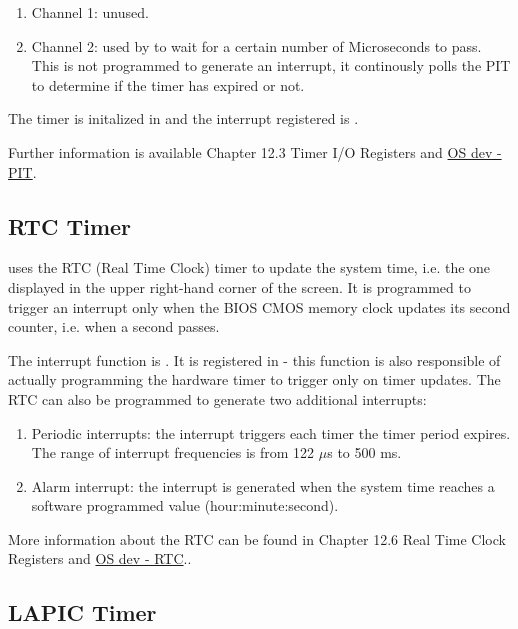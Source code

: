 \begin{appendices}
\begin{enumerate}
	\item Channel 1: unused.

	\item Channel 2: used by  to wait for a certain number of Microseconds to pass. This is not
programmed to generate an interrupt, it continously polls the PIT to determine if the timer has expired or not.
\end{enumerate}

The timer is initalized in  and the interrupt registered is .

Further information is available \cite{intelPch} Chapter 12.3 Timer I/O Registers and 
\href{http://wiki.osdev.org/Programmable_Interval_Timer}{OS dev - PIT}.

\subsection{RTC Timer}

\projectname uses the RTC (Real Time Clock) timer to update the system time, i.e. the one displayed in the upper right-hand
corner of the screen. It is programmed to trigger an interrupt only when the BIOS CMOS memory clock updates its second 
counter, i.e. when a second passes.

The interrupt function is . It is registered in  - this function is also
responsible of actually programming the hardware timer to trigger only on timer updates. The RTC can also be programmed
to generate two additional interrupts:
\begin{enumerate}
	\item Periodic interrupts: the interrupt triggers each timer the timer period expires. The range of interrupt
frequencies is from 122 $\mu$s to 500 ms.

	\item Alarm interrupt: the interrupt is generated when the system time reaches a software programmed value
(hour:minute:second).
\end{enumerate}

More information about the RTC can be found in \cite{intelPch} Chapter 12.6 Real Time Clock Registers and 
\href{http://wiki.osdev.org/RTC}{OS dev - RTC}..

\subsection{LAPIC Timer}


\end{appendices}
